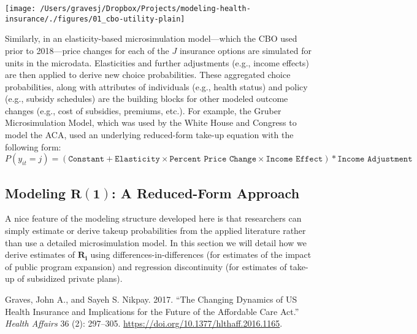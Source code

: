 \documentclass[
  10pt,
]{article}
\begin{document}
\texttt{[image: /Users/gravesj/Dropbox/Projects/modeling-health-insurance/./figures/01\_cbo-utility-plain]}

Similarly, in an elasticity-based microsimulation model---which the CBO
used prior to 2018---price changes for each of the \(J\) insurance
options are simulated for units in the microdata. Elasticities and
further adjustments (e.g., income effects) are then applied to derive
new choice probabilities. These aggregated choice probabilities, along
with attributes of individuals (e.g., health status) and policy (e.g.,
subsidy schedules) are the building blocks for other modeled outcome
changes (e.g., cost of subsidies, premiums, etc.). For example, the
Gruber Microsimulation Model, which was used by the White House and
Congress to model the ACA, used an underlying reduced-form take-up
equation with the following form: \[
P(y_{it} = j) = (\texttt{Constant} + \texttt{Elasticity} \times \texttt{Percent Price Change} \times \texttt{Income Effect})*\texttt{Income Adjustment}
\]

\hypertarget{modeling-boldsymbolr1-a-reduced-form-approach}{%
\subsection{\texorpdfstring{Modeling \(\boldsymbol{R(1)}\): A
Reduced-Form
Approach}{Modeling \textbackslash boldsymbol\{R(1)\}: A Reduced-Form Approach}}\label{modeling-boldsymbolr1-a-reduced-form-approach}}

A nice feature of the modeling structure developed here is that
researchers can simply estimate or derive takeup probabilities from the
applied literature rather than use a detailed microsimulation model. In
this section we will detail how we derive estimates of
\(\boldsymbol{R_i}\) using differences-in-differences (for estimates of
the impact of public program expansion) and regression discontinuity
(for estimates of take-up of subsidized private plans).

\hypertarget{refs}{}
\leavevmode\hypertarget{ref-gravesChangingDynamicsUS2017}{}%
Graves, John A., and Sayeh S. Nikpay. 2017. ``The Changing Dynamics of
US Health Insurance and Implications for the Future of the Affordable
Care Act.'' \emph{Health Affairs} 36 (2): 297--305.
\url{https://doi.org/10.1377/hlthaff.2016.1165}.
\end{document}
